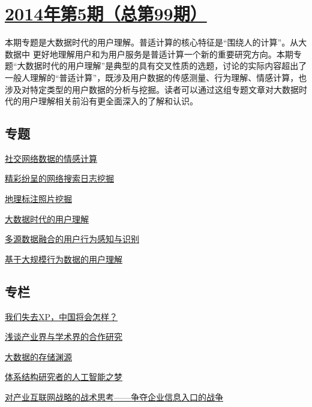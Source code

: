 \documentclass[a4paper]{article}
\begin{document}
\section{\href{http://history.ccf.org.cn/sites/ccf/jsjtbbd.jsp?contentId=2799676848706}{\textbf{2014年第5期（总第99期）}}}
本期专题是大数据时代的用户理解。普适计算的核心特征是“围绕人的计算”。从大数据中
更好地理解用户和为用户服务是普适计算一个新的重要研究方向。本期专题“大数据时代的用户理解”是典型的具有交叉性质的选题，讨论的实际内容超出了一般人理解的“普适计算”，既涉及用户数据的传感测量、行为理解、情感计算，也涉及对特定类型的用户数据的分析与挖掘。读者可以通过这组专题文章对大数据时代的用户理解相关前沿有更全面深入的了解和认识。
\subsection{专题}
\href{http://history.ccf.org.cn/resources/1190201776262/2014/05/12/3.pdf}{社交网络数据的情感计算}

\href{http://history.ccf.org.cn/resources/1190201776262/2014/05/12/4.pdf}{精彩纷呈的网络搜索日志挖掘}

\href{http://history.ccf.org.cn/resources/1190201776262/2014/05/12/5.pdf}{地理标注照片挖掘}

\href{http://history.ccf.org.cn/resources/1190201776262/2014/05/12/0.pdf}{大数据时代的用户理解}

\href{http://history.ccf.org.cn/resources/1190201776262/2014/05/12/1.pdf}{多源数据融合的用户行为感知与识别}

\href{http://history.ccf.org.cn/resources/1190201776262/2014/05/12/2.pdf}{基于大规模行为数据的用户理解}

\subsection{专栏}
\href{http://history.ccf.org.cn/resources/1190201776262/2014/05/12/11.pdf}{我们失去XP，中国将会怎样？}

\href{http://history.ccf.org.cn/resources/1190201776262/2014/05/20/6-1.pdf}{浅谈产业界与学术界的合作研究}

\href{http://history.ccf.org.cn/resources/1190201776262/2014/05/12/7.pdf}{大数据的存储渊源}

\href{http://history.ccf.org.cn/resources/1190201776262/2014/05/12/8.pdf}{体系结构研究者的人工智能之梦}

\href{http://history.ccf.org.cn/resources/1190201776262/2014/05/12/9.pdf}{对产业互联网战略的战术思考——争夺企业信息入口的战争}
\end{document}
